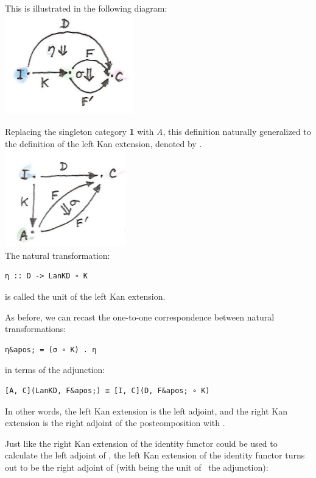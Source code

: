 This is illustrated in the following diagram:\\
\includegraphics[width=2.19792in]{images/kan112.jpg}

Replacing the singleton category \textbf{1} with \emph{A}, this
definition naturally generalized to the definition of the left Kan
extension, denoted by .\\
\includegraphics[width=2.06250in]{images/kan12.jpg}\\
The natural transformation:

\begin{verbatim}
η :: D -> LanKD ∘ K
\end{verbatim}

is called the unit of the left Kan extension.

As before, we can recast the one-to-one correspondence between natural
transformations:

\begin{verbatim}
η&apos; = (σ ∘ K) . η
\end{verbatim}

in terms of the adjunction:

\begin{verbatim}
[A, C](LanKD, F&apos;) ≅ [I, C](D, F&apos; ∘ K)
\end{verbatim}

In other words, the left Kan extension is the left adjoint, and the
right Kan extension is the right adjoint of the postcomposition with
.

Just like the right Kan extension of the identity functor could be used
to calculate the left adjoint of , the left Kan extension of
the identity functor turns out to be the right adjoint of 
(with  being the unit of~ the adjunction):

